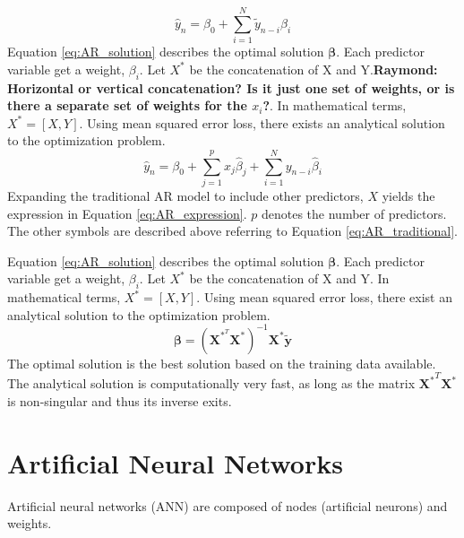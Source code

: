 \begin{equation} \label{eq:AR_traditional}
    \hat{y}_n = \beta_0 + \sum_{i = 1}^{N} \tilde{y}_{n-i} \beta_{i}
\end{equation}
Equation \eqref{eq:AR_solution} describes the optimal solution $\mathbf{\beta}$. Each predictor variable get a weight, $\beta_i$. Let $X^*$ be the concatenation of X and Y.\textbf{Raymond: Horizontal or vertical concatenation? Is it just one set of weights, or is there a separate set of weights for the $x_i$?}. In mathematical terms, $X^*=[X, Y]$. Using mean squared error loss, there exists an analytical solution to the optimization problem. 
\begin{equation} \label{eq:AR_expression}
    \hat{y}_n = \beta_0 + \sum_{j=1}^p x_j\hat{\beta}_j + \sum_{i = 1}^{N} y_{n-i}\hat{\beta}_{i}
\end{equation}
Expanding the traditional AR model to include other predictors, $X$ yields the expression in Equation \eqref{eq:AR_expression}. $p$ denotes the number of predictors. The other symbols are described above referring to Equation \eqref{eq:AR_traditional}.

Equation \eqref{eq:AR_solution} describes the optimal solution $\mathbf{\beta}$. Each predictor variable get a weight, $\beta_i$. Let $X^*$ be the concatenation of X and Y. In mathematical terms, $X^*=[X, Y]$. Using mean squared error loss, there exist an analytical solution to the optimization problem. 
\begin{equation} \label{eq:AR_solution}
    \mathbf{\beta}  = \left( \mathbf{X}^{*^T}\mathbf{X}^* \right)^{-1}\mathbf{X}^*\tilde{\mathbf{y}}
\end{equation}
The optimal solution is the best solution based on the training data available. The analytical solution is computationally very fast, as long as the matrix ${\mathbf{X}^*}^T\mathbf{X}^*$ is non-singular and thus its inverse exits.

\section{Artificial Neural Networks} \label{sec:artificial neural networks}
Artificial neural networks (ANN) are composed of nodes (artificial neurons) and weights.  

